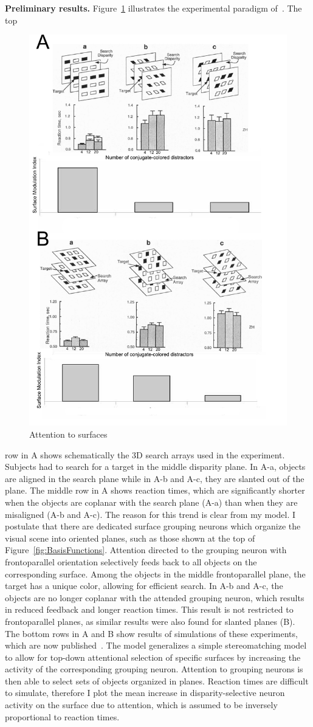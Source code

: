 \documentclass[11pt,notitlepage]{article}
\begin{document}
\textbf{Preliminary results.} Figure~\ref{fig:Nakayama} illustrates the experimental paradigm of~\citet{He_Nakayama95}. The top
\begin{figure}
  \vspace{-10pt}
  \centering 
  \includegraphics[width=.4\textwidth]{figs/nakayama_v2}
  \vspace{-30pt}
  \caption{Attention to surfaces} 
  \vspace{-15pt}
  \label{fig:Nakayama}
\end{figure}
row in A shows schematically the 3D search arrays used in the experiment. Subjects had to search for a target in the middle disparity plane. In A-a, objects are aligned in the search plane while in A-b and A-c, they are slanted out of the plane. The middle row in A shows reaction times, which are significantly shorter when the objects are coplanar with the search plane (A-a) than when they are misaligned (A-b and A-c). The reason for this trend is clear from my model. I postulate that there are dedicated surface grouping neurons which organize the visual scene into oriented planes, such as those shown at the top of Figure~\ref{fig:BasisFunctions}. Attention directed to the grouping neuron with frontoparallel orientation selectively feeds back to all objects on the corresponding surface. Among the objects in the middle frontoparallel plane, the target has a unique color, allowing for efficient search. In A-b and A-c, the objects are no longer coplanar with the attended grouping neuron, which results in reduced feedback and longer reaction times. This result is not restricted to frontoparallel planes, as similar results were also found for slanted planes (B). The bottom rows in A and B show
results of simulations of these experiments, which are now published~\citep{Hu_etal15a}. The model generalizes a simple stereomatching model~\citep{Marshall_etal96} to allow for top-down attentional selection of specific surfaces by increasing the activity of the corresponding grouping neuron. Attention to grouping neurons is then able to select sets of objects organized in planes. Reaction times are difficult to simulate, therefore I plot the mean increase in disparity-selective neuron activity on the surface due to attention, which is assumed to be inversely proportional to reaction times.
\end{document}
